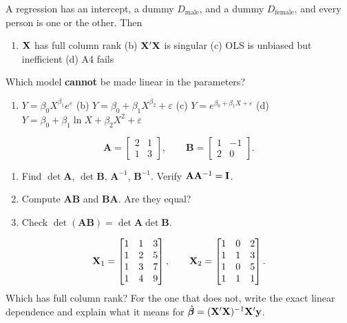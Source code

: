 \documentclass[11pt]{article}
\begin{document}
A regression has an intercept, a dummy $D_{\text{male}}$, and a dummy $D_{\text{female}}$, and every person is one or the other. Then
\begin{enumerate}[label=(\alph*)]
  \item $\mathbf{X}$ has full column rank \quad (b) $\mathbf{X}'\mathbf{X}$ is singular \quad (c) OLS is unbiased but inefficient \quad (d) A4 fails
\end{enumerate}

Which model \textbf{cannot} be made linear in the parameters?
\begin{enumerate}[label=(\alph*)]
  \item $Y=\beta_0X^{\beta_1}e^{\varepsilon}$ \quad (b) $Y=\beta_0+\beta_1X^{\beta_2}+\varepsilon$ \quad (c) $Y=e^{\beta_0+\beta_1X+\varepsilon}$ \quad (d) $Y=\beta_0+\beta_1\ln X+\beta_2X^2+\varepsilon$
\end{enumerate}

\[ \mathbf A=\begin{bmatrix}2&1\\1&3\end{bmatrix}, \qquad \mathbf B=\begin{bmatrix}1&-1\\2&0\end{bmatrix}. \]
\begin{enumerate}[label=(\alph*)]
  \item Find $\det\mathbf A$, $\det\mathbf B$, $\mathbf A^{-1}$, $\mathbf B^{-1}$. Verify $\mathbf A\mathbf A^{-1}=\mathbf{I}$.
  \item Compute $\mathbf{AB}$ and $\mathbf{BA}$. Are they equal?
  \item Check $\det(\mathbf{AB})=\det\mathbf A\det\mathbf B$.
\end{enumerate}

\[ \mathbf{X}_1=\begin{bmatrix}1&1&3\\1&2&5\\1&3&7\\1&4&9\end{bmatrix}, \qquad \mathbf{X}_2=\begin{bmatrix}1&0&2\\1&1&3\\1&0&5\\1&1&1\end{bmatrix}. \]
Which has full column rank? For the one that does not, write the exact linear dependence and explain what it means for $\hat{\bm{\beta}}=(\mathbf{X}'\mathbf{X})^{-1}\mathbf{X}'\mathbf{y}$.
\end{document}
